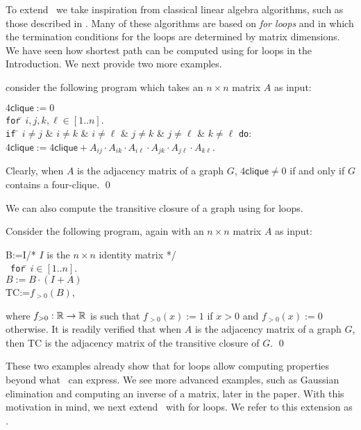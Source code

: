 To extend \lang\ we take inspiration from classical linear algebra algorithms, such as those described in \cite{num}. Many of these algorithms are based on \textit{for loops} and in which the termination conditions for the loops are determined by matrix dimensions. We have seen how shortest path can be computed using for loops in the Introduction. We next provide two more examples.

\begin{example}consider the following program which takes
an $n\times n$ matrix $A$ as input:
\begin{tabbing}
$4\mathsf{clique}:=0$\\
\texttt{for}\=\,  $i,j,k,\ell\in[1..n]$. \\
\> \texttt{if} \= $i\neq j$ \& $i\neq k$ \& $i\neq \ell$ \& $j\neq k$ \& $j\neq \ell$ \& $k\neq\ell$ \texttt{do}:\\
\> \> $4\mathsf{clique}:= 4\mathsf{clique} + A_{ij}\cdot A_{ik}\cdot A_{i\ell} \cdot A_{jk}\cdot A_{j\ell} \cdot A_{k\ell}$.  
\end{tabbing}
Clearly, when $A$ is the adjacency matrix of a graph $G$, $4\mathsf{clique}\neq 0$ if and only if $G$ contains a four-clique. \qed
\end{example}
We can also compute the transitive closure of a graph using for loops.
\begin{example}
Consider the following program, again with an $n\times n$ matrix $A$ as input:
\begin{tabbing}
B:=I\quad /* $I$ is the $n\times n$ identity matrix */\\\	
\texttt{for}\=\,  $i\in[1..n]$.\\
\> $B:=B\cdot (I+A)$\quad \\
\textsf{TC}:=$f_{>0}(B)$,
\end{tabbing}
where $f_{>0}:\mathbb{R}\to\mathbb{R}$ is such that $f_{>0}(x):=1$ if $x>0$ and $f_{>0}(x):=0$ otherwise. It is readily verified that when $A$ is the adjacency matrix of a graph $G$, then \textsf{TC} is the adjacency matrix of the transitive closure of $G$. \qed
\end{example}
These two examples already show that for loops allow computing properties beyond what \lang\ can express.
We see more advanced examples, such as Gaussian elimination and computing an inverse of a matrix, later in the paper. With this motivation in mind, we next extend \lang\ with for loops. We refer to this extension as \langfor. 

%
%
%

